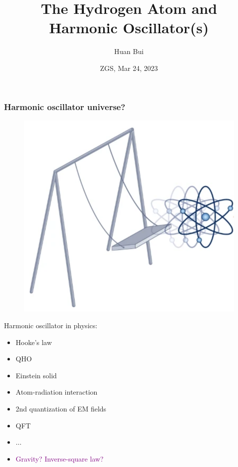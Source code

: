 \documentclass{beamer}
\title[\textcolor{white}{{}}]
{
The Hydrogen Atom and Harmonic Oscillator(s)
}
\author[Bui] %
{Huan Bui}
\institute[MIT]{MIT} %
\date{ZGS, Mar 24, 2023}
\theoremstyle{definition}
\begin{document}
 
\frame{\titlepage}

\begin{frame}
	\frametitle{Harmonic oscillator universe?}
	
	\begin{minipage}{0.39\textwidth}
	\begin{figure}
	\centering
	\includegraphics[width=1\textwidth]{figures/swinging_atom.png}
	\end{figure}
	\end{minipage}
	\begin{minipage}{0.6\textwidth}
	Harmonic oscillator in physics: 
	\begin{itemize}
		\item Hooke's law 
		\item QHO 
		\item Einstein solid 
		\item Atom-radiation interaction 
		\item 2nd quantization of EM fields  
		\item QFT 
		\item $\dots$ \pause
		\item \textcolor{purple}{Gravity? Inverse-square law?}	
	\end{itemize}
	\end{minipage}
	
	
	
\end{frame}
\end{document}
